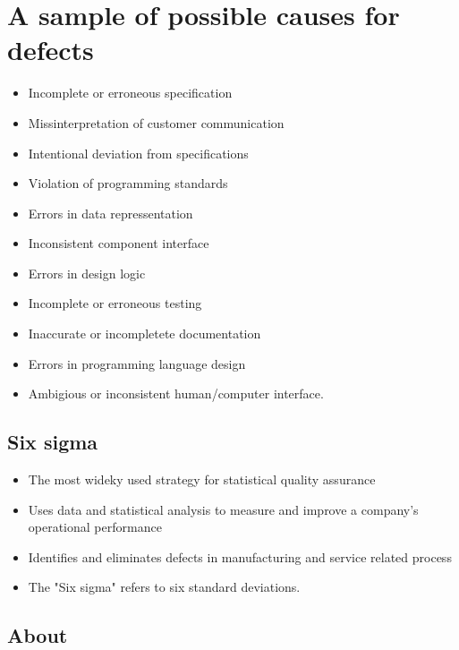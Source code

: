 \documentclass{article}
\begin{document}
\tableofcontents

\newpage

\section{A sample of possible causes for defects}

\begin{itemize}
  \item Incomplete or erroneous specification
  \item Missinterpretation of customer communication
  \item Intentional deviation from specifications
  \item Violation of programming standards
  \item Errors in data repressentation
  \item Inconsistent component interface
  \item Errors in design logic
  \item Incomplete or erroneous testing
  \item Inaccurate or incompletete documentation
  \item Errors in programming language design
  \item Ambigious or inconsistent human/computer interface.
\end{itemize}

\subsection{Six sigma}

\begin{itemize}
  \item The most wideky used strategy for statistical quality assurance
  \item Uses data and statistical analysis to measure and improve a company's operational performance
  \item Identifies and eliminates defects in manufacturing and service related process
  \item The "Six sigma" refers to six standard deviations.
\end{itemize}

\subsection{About}
\end{document}
